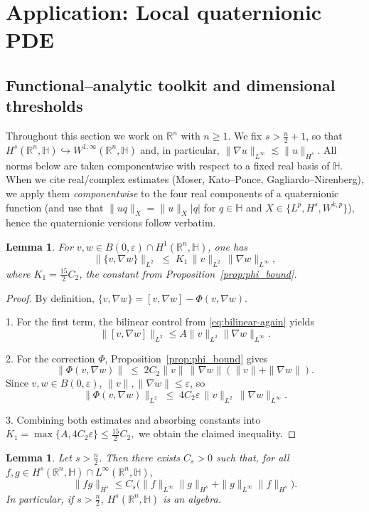 \documentclass[10pt]{amsart}
\numberwithin{equation}{section}
\newtheorem{lem}[theorem]{Lemma}
\theoremstyle{remark}
\theoremstyle{definition}
\begin{document}
\section{Application: Local quaternionic PDE}\label{sec:PDE}
\subsection{Functional--analytic toolkit and dimensional thresholds}\label{subsec:toolkit}

Throughout this section we work on $\mathbb{R}^n$ with $n\ge 1$.
We fix $s>\frac{n}{2}+1$, so that $H^{s}(\mathbb{R}^n,\mathbb{H})\hookrightarrow W^{1,\infty}(\mathbb{R}^n,\mathbb{H})$
and, in particular, $\|\nabla u\|_{L^\infty}\lesssim \|u\|_{H^{s}}$.
All norms below are taken componentwise with respect to a fixed real basis of $\mathbb{H}$.
When we cite real/complex estimates (Moser, Kato--Ponce, Gagliardo--Nirenberg),
we apply them \emph{componentwise} to the four real components of a quaternionic function
(and use that $\|uq\|_{X}=\|u\|_{X}|q|$ for $q\in\mathbb H$ and $X\in\{L^{p},H^{s},W^{k,p}\}$),
hence the quaternionic versions follow verbatim.


\begin{lem}\label{lem:Tbound}
For $v, w \in B(0, \varepsilon) \cap H^1(\mathbb{R}^n, \mathbb{H})$, one has
\[
\|\{v, \nabla w\}\|_{L^2} \;\leq\; K_1 \,\|v\|_{L^2}\, \|\nabla w\|_{L^\infty},
\]
where $K_1 = \tfrac{15}{2} C_2$, the constant from Proposition~\ref{prop:phi_bound}.
\end{lem}

\begin{proof}
By definition, $\{v,\nabla w\} = [v,\nabla w] - \Phi(v,\nabla w)$.

1. For the first term, the bilinear control from \eqref{eq:bilinear-again} yields
\[
\|[v,\nabla w]\|_{L^2} \leq A \|v\|_{L^2}\|\nabla w\|_{L^\infty}.
\]

2. For the correction $\Phi$, Proposition~\ref{prop:phi_bound} gives
\[
\|\Phi(v,\nabla w)\| \;\leq\; 2 C_2 \|v\|\,\|\nabla w\|(\|v\|+\|\nabla w\|).
\]
Since $v,w \in B(0,\varepsilon)$, $\|v\|,\|\nabla w\|\leq \varepsilon$, so
\[
\|\Phi(v,\nabla w)\|_{L^2} \;\leq\; 4 C_2 \varepsilon \,\|v\|_{L^2}\,\|\nabla w\|_{L^\infty}.
\]

3. Combining both estimates and absorbing constants into
\(
K_1 = \max\{A,4C_2\varepsilon\} \leq \tfrac{15}{2} C_2,
\)
we obtain the claimed inequality.
\end{proof}

\begin{lem}\label{lem:Moser}
Let $s>\frac{n}{2}$. Then there exists $C_s>0$ such that, for all $f,g\in H^{s}(\mathbb{R}^n,\mathbb{H})\cap L^\infty(\mathbb{R}^n,\mathbb{H})$,
\[
\|fg\|_{H^{s}}\le C_s\big(\|f\|_{L^\infty}\|g\|_{H^{s}}+\|g\|_{L^\infty}\|f\|_{H^{s}}\big).
\]
In particular, if $s>\frac{n}{2}$, $H^{s}(\mathbb{R}^n,\mathbb{H})$ is an algebra.
\end{lem}
\end{document}
